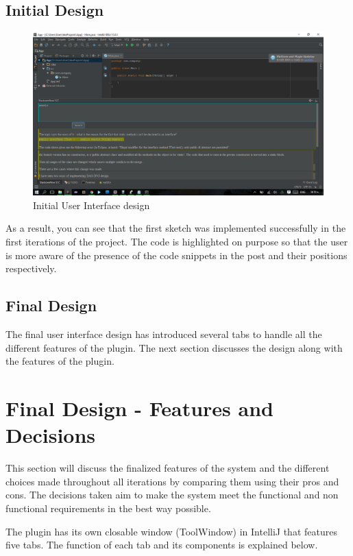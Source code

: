 \documentclass{l4proj}
\begin{document}
\subsection{Initial Design}
\begin{figure}[H]
\includegraphics[scale=0.5]{ui-old}
\centering
\caption{Initial User Interface design}\label{ui-old}
\label{fig:ui-old}
\end{figure}

As a result, you can see that the first sketch was implemented successfully in the first iterations of the project. The code is highlighted on purpose so that the user is more aware of the presence of the code snippets in the post and their positions respectively.

\subsection{Final Design}
The final user interface design has introduced several tabs to handle all the different features of the plugin. The next section discusses the design along with the features of the plugin.

\section{Final Design - Features and Decisions}
This section will discuss the finalized features of the system and the different choices made throughout all iterations by comparing them using their pros and cons. The decisions taken aim to make the system meet the functional and non functional requirements in the best way possible. 

\noindent
The plugin has its own closable window (ToolWindow) in IntelliJ that features five tabs. The function of each tab and its components is explained below.
\end{document}
